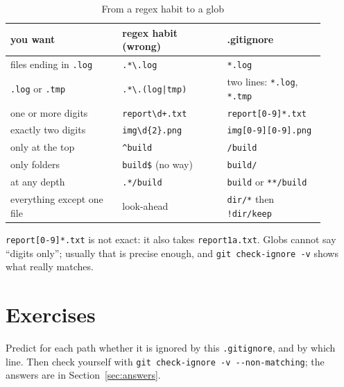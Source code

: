 \documentclass[11pt,a4paper]{article}
\begin{document}
\begin{table}[h]
\centering\small
\begin{tabular}{@{}L{0.32\linewidth}L{0.3\linewidth}L{0.28\linewidth}@{}}
  \toprule
  \textbf{you want}                         & \textbf{regex habit (wrong)}      & \textbf{.gitignore} \\
  \midrule
  files ending in \texttt{.log}             & \texttt{.*\textbackslash.log}     & \texttt{*.log} \\
  \texttt{.log} or \texttt{.tmp}            & \texttt{.*\textbackslash.(log|tmp)} & two lines: \texttt{*.log}, \texttt{*.tmp} \\
  one or more digits                        & \texttt{report\textbackslash d+.txt} & \texttt{report[0-9]*.txt} \\
  exactly two digits                        & \texttt{img\textbackslash d\{2\}.png} & \texttt{img[0-9][0-9].png} \\
  only at the top                           & \texttt{\textasciicircum build}   & \texttt{/build} \\
  only folders                              & \texttt{build\$} (no way)         & \texttt{build/} \\
  at any depth                              & \texttt{.*/build}                 & \texttt{build} or \texttt{**/build} \\
  everything except one file                & look-ahead                        & \texttt{dir/*} then \texttt{!dir/keep} \\
  \bottomrule
\end{tabular}
\caption{From a regex habit to a glob}
\end{table}%

\texttt{report[0-9]*.txt} is not exact: it also takes \texttt{report1a.txt}. Globs cannot say ``digits only'';
usually that is precise enough, and \texttt{git check-ignore -v} shows what really matches.



\section{Exercises}


Predict for each path whether it is ignored by this \texttt{.gitignore}, and by which line. Then check yourself with
\texttt{git check-ignore -v -{}-non-matching}; the answers are in Section~\ref{sec:answers}.
\end{document}

